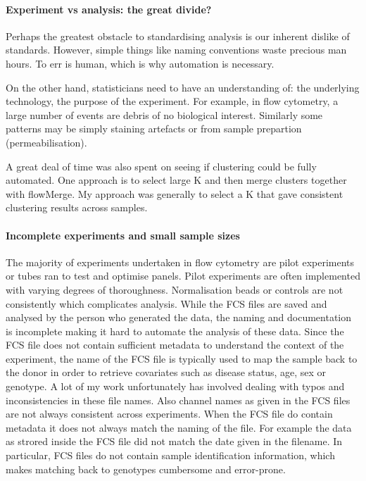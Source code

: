 \paragraph{Experiment vs analysis: the great divide?}

Perhaps the greatest obstacle to standardising analysis is our inherent dislike of standards.
However, simple things like naming conventions waste precious man hours.
To err is human,  which is why automation is necessary.

On the other hand, statisticians need to have an understanding of: the underlying technology, the purpose of the experiment.
For example, in flow cytometry, a large number of events are debris of no biological interest.
Similarly some patterns may be simply staining artefacts or from sample prepartion (permeabilisation).

A great deal of time was also spent on seeing if clustering could be fully automated. 
One approach is to select large K and then merge clusters together with flowMerge.
My approach was generally to select a K that gave consistent clustering results across samples.



\paragraph{ Incomplete experiments and small sample sizes}

The majority of experiments undertaken in flow cytometry are pilot experiments or tubes ran to test and optimise panels.
Pilot experiments
are often implemented with varying degrees of thoroughness.
Normalisation beads or controls are not consistently which complicates analysis.
While the FCS files are saved and analysed by the person who generated the data, the naming and documentation is incomplete
making it hard to automate the analysis of these data.
Since the FCS file does not contain sufficient metadata to understand the context of the experiment, the name of the FCS
file is typically used to map the sample back to the donor in order to retrieve covariates such as disease status, age, sex or genotype.
A lot of my work unfortunately has involved dealing with typos and inconsistencies in these file names.
Also channel names as given in the FCS files are not always consistent across experiments.
When the FCS file do contain metadata it does not always match the naming of the file.
For example the data as strored inside the FCS file did not match the date given in the filename.
In particular, FCS files do not contain sample identification information, which makes matching back to genotypes cumbersome and error-prone.

